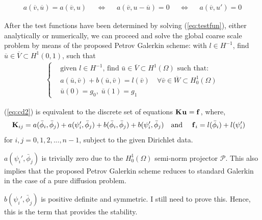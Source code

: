 \begin{align}
	& a(\overline{v}, \overline{u}) = a(\overline{v}, u) &  
	&  \Longleftrightarrow &
	& a(\overline{v}, u - \overline{u}) = 0  &
	&  \Longleftrightarrow &
	& a(\overline{v}, u') = 0 &
\end{align}

After the test functions have been determined by solving (\ref{eq:testfun}), either analytically or numerically, we can proceed and solve the global coarse scale problem by means of the proposed Petrov Galerkin scheme: with $l \in H^{-1}$, find $\overline{u} \in  \overline{V} \subset H^1(0,1)$, such that
\begin{align}
\begin{cases} & \text{given $l \in H^{-1}$, find $\bar{u} \in \overline{V} \subset H^1(\Omega)$ such that: } \\
	& a(\bar{u},\bar{v}) + b(\bar{u},\bar{v}) = l(\bar{v}) \quad \forall \bar{v} \in \overline{W} \subset H^1_0(\Omega)  \\
	& \bar{u}(0) = g_0, \; \bar{u}(1) = g_1  
\end{cases}
	\label{eq:cd2}
\end{align}

\begin{remark} (\ref{eq:cd2})  is equivalent to the discrete set of equations $\boldsymbol{\mathrm{K}}_{} \boldsymbol{\mathrm{u}}_{} = \boldsymbol{\mathrm{f}}_{}$, where,
\begin{align}
	& \boldsymbol{\mathrm{K}}_{ij} = a(\bar{\phi}_i, \bar{\phi}_j) + a(\psi_i', \bar{\phi}_j)  + b(\bar{\phi}_i, \bar{\phi}_j) + b(\psi_i', \bar{\phi}_j) &
	&\text{and }&
	& \boldsymbol{\mathrm{f}}_{i} = l(\bar{\phi}_i) + l(\psi_i')   &
\end{align}
for $i,j = 0,1,2,...,n-1$, subject to the given Dirichlet data.
\end{remark}

\begin{remark} $a(\psi_i', \bar{\phi}_j)$  is trivially zero due to the $H^1_0(\Omega)$ semi-norm projector $\mathcal{P}$. This also implies that the proposed Petrov Galerkin scheme reduces to standard Galerkin in the case of a pure diffusion problem.
\end{remark}

\begin{remark} $b(\psi_i', \bar{\phi}_j)$  is positive definite and symmetric. I still need to prove this. Hence, this is the term that provides the stability.
\end{remark}

